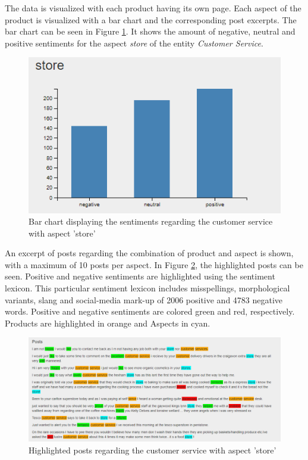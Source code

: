\documentclass[10pt,a4paper]{article}
\begin{document}
		The data is visualized with each product having its own page. Each aspect of the product is visualized with a bar chart and the corresponding post excerpts. The bar chart can be seen in Figure \ref{fig:barchart}. It shows the amount of negative, neutral and positive sentiments for the aspect \textit{store} of the entity \textit{Customer Service}.
	
		\begin{figure}[h]
			\centering
			\includegraphics[width=0.7\linewidth]{data/barchart}
			\caption{Bar chart displaying the sentiments regarding the customer service with aspect 'store'}
			\label{fig:barchart}
		\end{figure}
			
		An excerpt of posts regarding the combination of product and aspect is shown, with a maximum of 10 posts per aspect. In Figure \ref{fig:posts}, the highlighted posts can be seen. Positive and negative sentiments are highlighted using the sentiment lexicon. This particular sentiment lexicon includes misspellings, morphological variants, slang and social-media mark-up of 2006 positive and 4783 negative words. Positive and negative sentiments are colored green and red, respectively. Products are highlighted in orange and Aspects in cyan.
			
		\begin{figure}[h]
			\centering
			\includegraphics[width=0.9\linewidth]{data/posts}
			\caption{Highlighted posts regarding the customer service with aspect 'store'}
			\label{fig:posts}
		\end{figure}
		
\end{document}
